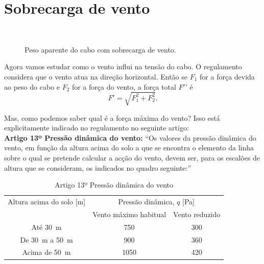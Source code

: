 \section{Sobrecarga de vento}
\begin{figure}
  \vspace{-1.2cm}
  \begin{figurebox}
    \centering
    \\
    \caption{Peso aparente do cabo com sobrecarga de vento.}
    \label{fig:2}
  \end{figurebox}
  \vspace{-.8cm}
\end{figure}

Agora vamos estudar como o vento influi na tensão do cabo. O regulamento considera que o vento atua na direção horizontal. Então se $F_1$ for a força devida ao peso do cabo e $F_2$ for a força do vento, a força total $F'$' é
\begin{equation}
  \label{eq:2}
  F'=\sqrt{F_1^2+F_2^2}.
\end{equation}


Mas, como podemos saber qual é a força máxima do vento? Isso está explicitamente indicado no regulamento no seguinte artigo:\\
{\bf Artigo 13º Pressão
  dinâmica do vento:} ``Os valores da pressão dinâmica do vento, em função da altura acima
do solo a que se encontra o elemento da linha sobre o qual se pretende
calcular a acção do vento, devem ser, para os escalões de altura que
se consideram, os indicados no quadro seguinte:''

\begin{table}[!h]
  \centering
  \begin{tabular}{ccc}
    \toprule
    Altura acima do solo [\si{m}] & 
    \multicolumn{2}{c}{Pressão dinâmica, $q$ [\si{Pa}]}\\
    \cmidrule(r){2-3}
    & Vento máximo habitual & Vento reduzido\\
    \midrule
    Até \SI{30}{m} & 750 & 300\\
    De \SI{30}{m} a \SI{50}{m} &  900 & 360\\
    Acima de \SI{50}{m} & 1050 & 420\\
    \bottomrule
  \end{tabular}
  \caption{Artigo 13º Pressão dinâmica do vento}
  \label{tab:3}
\end{table}

